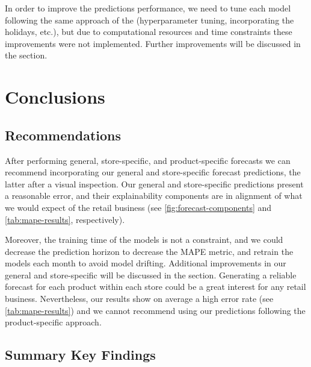 In order to improve the predictions performance, we need to tune each model following the same approach of the  (hyperparameter tuning, incorporating the holidays, etc.), but due to computational resources and time constraints these improvements were not implemented. Further improvements will be discussed in the  section. 

\section[Conclusions]{Conclusions}
\label{sec:conclusions}

\subsection[Recommendations]{Recommendations}
\label{sec:recommendations}

After performing general, store-specific, and product-specific forecasts we can recommend incorporating our general and store-specific forecast predictions, the latter after a visual inspection. Our general and store-specific predictions present a reasonable error, and their explainability components are in alignment of what we would expect of the retail business (see \autoref{fig:forecast-components} and \autoref{tab:mape-results}, respectively). 

Moreover, the training time of the models is not a constraint, and we could decrease the prediction horizon to decrease the MAPE metric, and retrain the models each month to avoid model drifting. Additional improvements in our general and store-specific will be discussed in the  section. Generating a reliable forecast for each product within each store could be a great interest for any retail business. Nevertheless, our results show on average a high error rate (see \autoref{tab:mape-results}) and we cannot recommend using our predictions following the product-specific approach. 

\subsection[Summary Key Findings]{Summary Key Findings}
\label{sec:key-findings}

